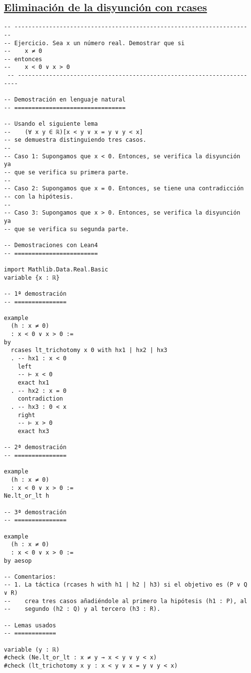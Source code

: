 \subsection{\href{./src/Logica/Eliminacion\_de\_la\_disyuncion\_con\_rcases.lean}{Eliminación de la disyunción con rcases}}
\label{sec:org306b07e}
\begin{verbatim}
-- ---------------------------------------------------------------------
-- Ejercicio. Sea x un número real. Demostrar que si
--    x ≠ 0
-- entonces
--    x < 0 ∨ x > 0
 -- ----------------------------------------------------------------------

-- Demostración en lenguaje natural
-- ================================

-- Usando el siguiente lema
--    (∀ x y ∈ ℝ)[x < y ∨ x = y ∨ y < x]
-- se demuestra distinguiendo tres casos.
--
-- Caso 1: Supongamos que x < 0. Entonces, se verifica la disyunción ya
-- que se verifica su primera parte.
--
-- Caso 2: Supongamos que x = 0. Entonces, se tiene una contradicción
-- con la hipótesis.
--
-- Caso 3: Supongamos que x > 0. Entonces, se verifica la disyunción ya
-- que se verifica su segunda parte.

-- Demostraciones con Lean4
-- ========================

import Mathlib.Data.Real.Basic
variable {x : ℝ}

-- 1ª demostración
-- ===============

example
  (h : x ≠ 0)
  : x < 0 ∨ x > 0 :=
by
  rcases lt_trichotomy x 0 with hx1 | hx2 | hx3
  . -- hx1 : x < 0
    left
    -- ⊢ x < 0
    exact hx1
  . -- hx2 : x = 0
    contradiction
  . -- hx3 : 0 < x
    right
    -- ⊢ x > 0
    exact hx3

-- 2ª demostración
-- ===============

example
  (h : x ≠ 0)
  : x < 0 ∨ x > 0 :=
Ne.lt_or_lt h

-- 3ª demostración
-- ===============

example
  (h : x ≠ 0)
  : x < 0 ∨ x > 0 :=
by aesop

-- Comentarios:
-- 1. La táctica (rcases h with h1 | h2 | h3) si el objetivo es (P ∨ Q ∨ R)
--    crea tres casos añadiéndole al primero la hipótesis (h1 : P), al
--    segundo (h2 : Q) y al tercero (h3 : R).

-- Lemas usados
-- ============

variable (y : ℝ)
#check (Ne.lt_or_lt : x ≠ y → x < y ∨ y < x)
#check (lt_trichotomy x y : x < y ∨ x = y ∨ y < x)
\end{verbatim}

